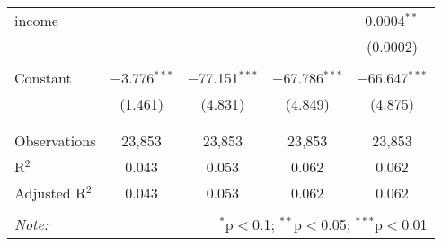 \begin{table}[!htbp]
\begin{tabular}{@{\extracolsep{-5pt}}lcccc}
 income &  &  &  & 0.0004$^{**}$ \\ 
  &  &  &  & (0.0002) \\ 
  & & & & \\ 
 Constant & $-$3.776$^{***}$ & $-$77.151$^{***}$ & $-$67.786$^{***}$ & $-$66.647$^{***}$ \\ 
  & (1.461) & (4.831) & (4.849) & (4.875) \\ 
  & & & & \\ 
\hline \\[-1.8ex] 
Observations & 23,853 & 23,853 & 23,853 & 23,853 \\ 
R$^{2}$ & 0.043 & 0.053 & 0.062 & 0.062 \\ 
Adjusted R$^{2}$ & 0.043 & 0.053 & 0.062 & 0.062 \\ 
\hline 
\hline \\[-1.8ex] 
\textit{Note:}  & \multicolumn{4}{r}{$^{*}$p$<$0.1; $^{**}$p$<$0.05; $^{***}$p$<$0.01} \\ 
\end{tabular} 
\end{table} 
